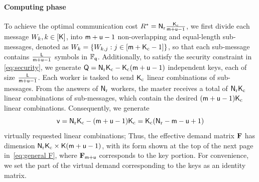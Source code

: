 \documentclass[conference,letterpaper]{IEEEtran}
\begin{document}
\paragraph*{Computing phase}
To achieve the optimal communication cost \( R^* = {\sf N}_{\rm r} \frac{{\sf K}_{\rm c}}{{\sf m} + {\sf u} - 1} \), we first divide each message \( W_k, k \in [{\sf K}] \), into \( {\sf m} + {\sf u} - 1 \) non-overlapping and equal-length sub-messages, denoted as \( W_{k} = \{W_{k,j} : j \in [{\sf m} + {\sf K}_{\rm c} - 1]\} \), so that each sub-message contains \( \frac{{\sf L}}{{\sf m} + {\sf u} - 1} \) symbols in \( \mathbb{F}_{{\sf q}} \). Additionally, to satisfy the security constraint in \eqref{eq:security}, we generate \({\sf Q} =  {\sf N}_{\rm r}{\sf K}_{\rm c} - {\sf K}_{\rm c} ( {\sf m} + {\sf u} - 1) \) independent keys, each of size \( \frac{{\sf L}}{{\sf m} + {\sf u} - 1} \). Each worker is tasked to send \( {\sf K}_{\rm c}\) linear combinations of sub-messages. 
From the answers of \( {\sf N}_{\rm r}  \) workers, the master receives a total of \( {\sf N}_{\rm r} {\sf K}_{\rm c} \) linear combinations of sub-messages, which contain the desired \( ({\sf m} + {\sf u} - 1) {\sf K}_{\rm c}  \) linear combinations. Consequently, 
we generate 
$$
{\sf v} = {\sf N}_{\rm r} {\sf K}_{\rm c} - ({\sf m}+{\sf u}-1){\sf K}_{\rm c} ={\sf K}_{\rm c} ({\sf N}_{\rm r}-{\sf m}-{\sf u}+1)
$$
 virtually requested linear combinations; Thus, the effective demand matrix ${\bf F}$ has dimension ${\sf N}_{\rm r}{\sf K}_{\rm c} \times {\sf K}({\sf m}+{\sf u}-1)$, with its form shown at the top of the next page in~\eqref{eq:general F}, where ${\bf F}_{{\sf m}+{\sf u}}$ corresponds to the key portion.
 For convenience, we set the part of the virtual demand corresponding to the keys as an identity matrix.
 
\end{document}
